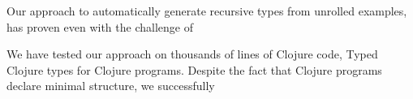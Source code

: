 
Our approach to automatically
generate recursive types from unrolled examples,
has proven
even with the challenge of 

We have tested our approach on thousands of lines
of Clojure code,
Typed Clojure types for Clojure
programs. Despite the fact that Clojure programs
declare minimal structure, we successfully 
